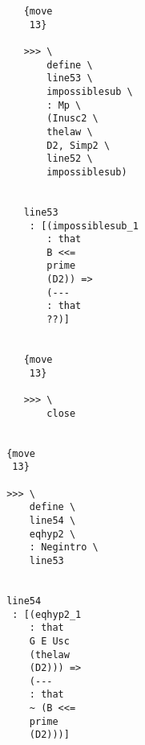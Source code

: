 \documentclass[12pt]{article}
\begin{document}
\begin{verbatim}
                                          {move 
                                           13}

                                          >>> \
                                              define \
                                              line53 \
                                              impossiblesub \
                                              : Mp \
                                              (Inusc2 \
                                              thelaw \
                                              D2, Simp2 \
                                              line52 \
                                              impossiblesub)


                                          line53 
                                           : [(impossiblesub_1 
                                              : that 
                                              B <<= 
                                              prime 
                                              (D2)) => 
                                              (--- 
                                              : that 
                                              ??)]


                                          {move 
                                           13}

                                          >>> \
                                              close


                                       {move 
                                        13}

                                       >>> \
                                           define \
                                           line54 \
                                           eqhyp2 \
                                           : Negintro \
                                           line53


                                       line54 
                                        : [(eqhyp2_1 
                                           : that 
                                           G E Usc 
                                           (thelaw 
                                           (D2))) => 
                                           (--- 
                                           : that 
                                           ~ (B <<= 
                                           prime 
                                           (D2)))]



\end{verbatim}
\end{document}
